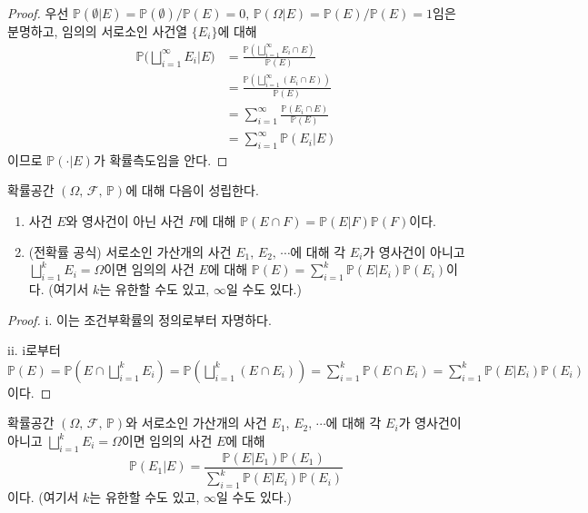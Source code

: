 \begin{proof}
    우선 $\mathbb{P}(\emptyset\vert E)=\mathbb{P}(\emptyset)/\mathbb{P}(E)=0,\,\mathbb{P}(\Omega\vert E)=\mathbb{P}(E)/\mathbb{P}(E)=1$임은 분명하고, 임의의 서로소인 사건열 $\{E_i\}$에 대해
    \begin{align*}
        \mathbb{P}\bigg(\bigsqcup_{i=1}^\infty E_i\vert E\bigg)&=\frac{\mathbb{P}(\bigsqcup_{i=1}^\infty E_i\cap E)}{\mathbb{P}(E)}\\
        &=\frac{\mathbb{P}(\bigsqcup_{i=1}^\infty(E_i\cap E))}{\mathbb{P}(E)}\\
        &=\sum_{i=1}^\infty\frac{\mathbb{P}(E_i\cap E)}{\mathbb{P}(E)}\\
        &=\sum_{i=1}^\infty\mathbb{P}(E_i\vert E)
    \end{align*}
    이므로 $\mathbb{P}(\cdot\vert E)$가 확률측도임을 안다.
\end{proof}

\begin{theorem}
    확률공간 $(\Omega,\,\mathcal{F},\,\mathbb{P})$에 대해 다음이 성립한다.
    \begin{enumerate}
        \item 사건 $E$와 영사건이 아닌 사건 $F$에 대해 $\mathbb{P}(E\cap F)=\mathbb{P}(E\vert F)\mathbb{P}(F)$이다.
        \item (전확률 공식) 서로소인 가산개의 사건 $E_1,\,E_2,\,\cdots$에 대해 각 $E_i$가 영사건이 아니고 $\bigsqcup_{i=1}^kE_i=\Omega$이면 임의의 사건 $E$에 대해 $\mathbb{P}(E)=\sum_{i=1}^k\mathbb{P}(E\vert E_i)\mathbb{P}(E_i)$이다. (여기서 $k$는 유한할 수도 있고, $\infty$일 수도 있다.)
    \end{enumerate}
\end{theorem}

\begin{proof}
    i. 이는 조건부확률의 정의로부터 자명하다.
    
    ii. i로부터 $\mathbb{P}(E)=\mathbb{P}(E\cap\bigsqcup_{i=1}^kE_i)=\mathbb{P}(\bigsqcup_{i=1}^k(E\cap E_i))=\sum_{i=1}^k\mathbb{P}(E\cap E_i)=\sum_{i=1}^k\mathbb{P}(E\vert E_i)\mathbb{P}(E_i)$이다.
\end{proof}

\begin{theorem}[Bayes]
    확률공간 $(\Omega,\,\mathcal{F},\,\mathbb{P})$와 서로소인 가산개의 사건 $E_1,\,E_2,\,\cdots$에 대해 각 $E_i$가 영사건이 아니고 $\bigsqcup_{i=1}^kE_i=\Omega$이면 임의의 사건 $E$에 대해
    \begin{equation*}
        \mathbb{P}(E_1\vert E)=\frac{\mathbb{P}(E\vert E_1)\mathbb{P}(E_1)}{\sum_{i=1}^k\mathbb{P}(E\vert E_i)\mathbb{P}(E_i)}
    \end{equation*}
    이다. (여기서 $k$는 유한할 수도 있고, $\infty$일 수도 있다.)
\end{theorem}

